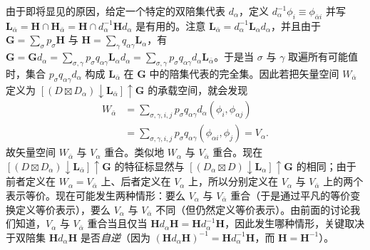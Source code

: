 由于即将显见的原因，给定一个特定的双陪集代表 $d_{\alpha}$，定义 $d^{-1}_{\alpha}\phi_{i} \equiv \phi_{\bar{\alpha}i}$ 并写 $\mathbf{L}_{\bar{\alpha}} = \mathbf{H} \cap \mathbf{H}_{\bar{\alpha}} = \mathbf{H} \cap d^{-1}_{\alpha}\mathbf{H}d_{\alpha}$ 是有用的。注意 $\mathbf{L}_{\bar{\alpha}} = d^{-1}_{\alpha}\mathbf{L}_{\alpha}d_{\alpha}$，并且由于 $\mathbf{G} = \sum_{\sigma}p_{\sigma}\mathbf{H}$ 与 $\mathbf{H} = \sum_{\gamma}q_{\alpha\gamma}\mathbf{L}_{\alpha}$，有 $\mathbf{G} = \mathbf{G}d_{\alpha} = \sum_{\sigma, \gamma}p_{\sigma}q_{\alpha\gamma}\mathbf{L}_{\alpha}d_{\alpha} = \sum_{\sigma, \gamma}p_{\sigma}q_{\alpha\gamma}d_{\alpha}\mathbf{L}_{\bar{\alpha}}$。于是当 $\sigma$ 与 $\gamma$ 取遍所有可能值时，集合 $p_{\sigma}q_{\alpha\gamma}d_{\alpha}$ 构成 $\mathbf{L}_{\bar{\alpha}}$ 在 $\mathbf{G}$ 中的陪集代表的完全集。因此若把矢量空间 $W_{\bar{\alpha}}$ 定义为 $\left[(D \boxtimes D_{\alpha}) \downarrow \mathbf{L}_{\bar{\alpha}}\right] \uparrow \mathbf{G}$ 的承载空间，就会发现
\begin{equation*}
\begin{array}{rl}
W_{\bar{\alpha}} &= \sum_{\sigma, \gamma, i, j}p_{\sigma}q_{\alpha\gamma}d_{\alpha}(\phi_{i}, \phi_{\alpha j})\\
&= \sum_{\sigma, \gamma, i, j}p_{\sigma}q_{\alpha\gamma}(\phi_{\alpha i}, \phi_{j}) = V_{\alpha}.
\end{array}
\tag{4.8.9}
\end{equation*}
故矢量空间 $W_{\bar{\alpha}}$ 与 $V_{\alpha}$ 重合。类似地 $W_{\alpha}$ 与 $V_{\bar{\alpha}}$ 重合。现在 $\left[(D \boxtimes D_{\alpha}) \downarrow \mathbf{L}_{\bar{\alpha}}\right] \uparrow \mathbf{G}$ 的特征标显然与 $\left[(D_{\alpha} \boxtimes D) \downarrow \mathbf{L}_{\alpha}\right] \uparrow \mathbf{G}$ 的相同；由于前者定义在 $W_{\alpha} = V_{\bar{\alpha}}$ 上、后者定义在 $V_{\alpha}$ 上，所以分别定义在 $V_{\alpha}$ 与 $V_{\bar{\alpha}}$ 上的两个表示等价。现在可能发生两种情形：要么 $V_{\alpha}$ 与 $V_{\bar{\alpha}}$ 重合（于是通过平凡的等价变换定义等价表示），要么 $V_{\alpha}$ 与 $V_{\bar{\alpha}}$ 不同（但仍然定义等价表示）。由前面的讨论我们知道，$V_{\alpha}$ 与 $V_{\bar{\alpha}}$ 重合当且仅当 $\mathbf{H}d_{\alpha}\mathbf{H} = \mathbf{H}d^{-1}_{\alpha}\mathbf{H}$，因此发生哪种情形，关键取决于双陪集 $\mathbf{H}d_{\alpha}\mathbf{H}$ 是否\textit{自逆}（因为 $(\mathbf{H}d_{\alpha}\mathbf{H})^{-1} = \mathbf{H}d^{-1}_{\alpha}\mathbf{H}$，而 $\mathbf{H} = \mathbf{H}^{-1}$）。


